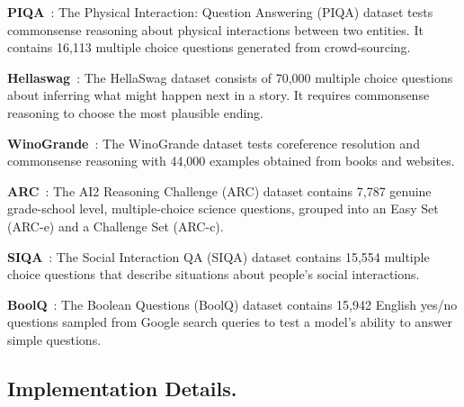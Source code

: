 \textbf{PIQA}~\cite{PIQA}: The Physical Interaction: Question Answering (PIQA) dataset tests commonsense reasoning about physical interactions between two entities. It contains 16,113 multiple choice questions generated from crowd-sourcing.

\textbf{Hellaswag}~\cite{Hellaswag}: The HellaSwag dataset consists of 70,000 multiple choice questions about inferring what might happen next in a story. It requires commonsense reasoning to choose the most plausible ending.

\textbf{WinoGrande}~\cite{WinoGrande}: The WinoGrande dataset tests coreference resolution and commonsense reasoning with 44,000 examples obtained from books and websites. 

\textbf{ARC}~\cite{arc}: The AI2 Reasoning Challenge (ARC) dataset contains 7,787 genuine grade-school level, multiple-choice science questions, grouped into an Easy Set (ARC-e) and a Challenge Set (ARC-c).

\textbf{SIQA}~\cite{siqa}: The Social Interaction QA (SIQA) dataset contains 15,554 multiple choice questions that describe situations about people's social interactions. 

\textbf{BoolQ}~\cite{boolq}: The Boolean Questions (BoolQ) dataset contains 15,942 English yes/no questions sampled from Google search queries to test a model's ability to answer simple questions.


\begin{table}[t]
\centering
\caption{The statistics of the benchmarks used in the overall experiment.}
\label{tab:bench}  %
\end{table}


\subsection{Implementation Details.}

